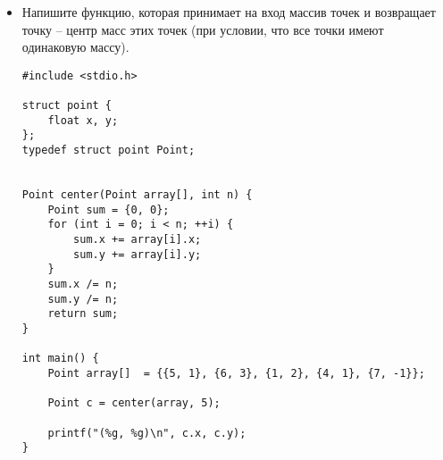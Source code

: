 \documentclass{article}
\begin{document}
\begin{itemize}
\newpage
\item Напишите функцию, которая принимает на вход массив точек и возвращает точку -- центр масс этих точек (при условии, что все точки имеют одинаковую массу).

\begin{lstlisting}[backgroundcolor = \color{solcolor}]
#include <stdio.h>

struct point {
    float x, y;
};
typedef struct point Point;


Point center(Point array[], int n) {
    Point sum = {0, 0};
    for (int i = 0; i < n; ++i) {
        sum.x += array[i].x;
        sum.y += array[i].y;
    }
    sum.x /= n;
    sum.y /= n;
    return sum;
}

int main() {
    Point array[]  = {{5, 1}, {6, 3}, {1, 2}, {4, 1}, {7, -1}};
    
    Point c = center(array, 5);
    
    printf("(%g, %g)\n", c.x, c.y);
}
\end{lstlisting}
\end{itemize}
\end{document}
